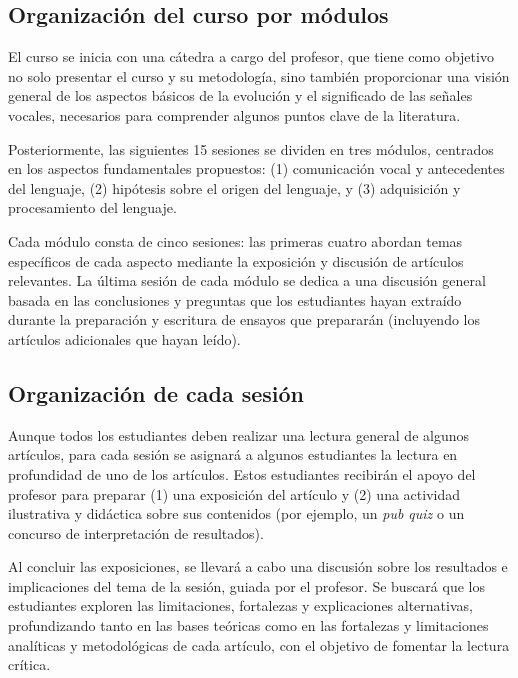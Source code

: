 \documentclass[11pt,a4paper,]{awesome-cv}
\begin{document}
\hypertarget{organizaciuxf3n-del-curso-por-muxf3dulos}{%
\subsection{Organización del curso por
módulos}\label{organizaciuxf3n-del-curso-por-muxf3dulos}}

\begin{footnotesize}
El curso se inicia con una cátedra a cargo del profesor, que tiene como objetivo no solo presentar el curso y su metodología, sino también proporcionar una visión general de los aspectos básicos de la evolución y el significado de las señales vocales, necesarios para comprender algunos puntos clave de la literatura. 

Posteriormente, las siguientes 15 sesiones se dividen en tres módulos, centrados en los aspectos fundamentales propuestos: (1) comunicación vocal y antecedentes del lenguaje, (2) hipótesis sobre el origen del lenguaje, y (3) adquisición y procesamiento del lenguaje.

Cada módulo consta de cinco sesiones: las primeras cuatro abordan temas específicos de cada aspecto mediante la exposición y discusión de artículos relevantes. La última sesión de cada módulo se dedica a una discusión general basada en las conclusiones y preguntas que los estudiantes hayan extraído durante la preparación y escritura de ensayos que prepararán (incluyendo los artículos adicionales que hayan leído).
\end{footnotesize}

\hypertarget{organizaciuxf3n-de-cada-sesiuxf3n}{%
\subsection{Organización de cada
sesión}\label{organizaciuxf3n-de-cada-sesiuxf3n}}

\begin{footnotesize}
Aunque todos los estudiantes deben realizar una lectura general de algunos artículos, para cada sesión se asignará a algunos estudiantes la lectura en profundidad de uno de los artículos. Estos estudiantes recibirán el apoyo del profesor para preparar (1) una exposición del artículo y (2) una actividad ilustrativa y didáctica sobre sus contenidos (por ejemplo, un \textit{pub quiz} o un concurso de interpretación de resultados).

Al concluir las exposiciones, se llevará a cabo una discusión sobre los resultados e implicaciones del tema de la sesión, guiada por el profesor. Se buscará que los estudiantes exploren las limitaciones, fortalezas y explicaciones alternativas, profundizando tanto en las bases teóricas como en las fortalezas y limitaciones analíticas y metodológicas de cada artículo, con el objetivo de fomentar la lectura crítica.
\end{footnotesize}
\end{document}
